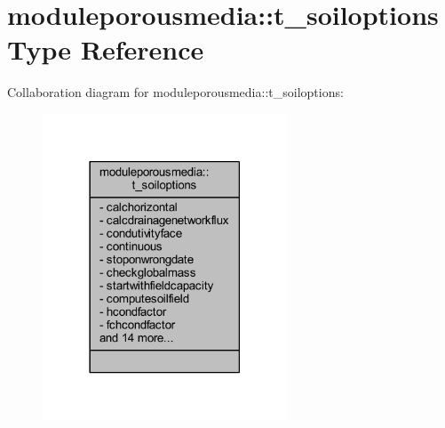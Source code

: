 \hypertarget{structmoduleporousmedia_1_1t__soiloptions}{}\section{moduleporousmedia\+:\+:t\+\_\+soiloptions Type Reference}
\label{structmoduleporousmedia_1_1t__soiloptions}


Collaboration diagram for moduleporousmedia\+:\+:t\+\_\+soiloptions\+:\nopagebreak
\begin{figure}[H]
\begin{center}
\leavevmode
\includegraphics[width=206pt]{structmoduleporousmedia_1_1t__soiloptions__coll__graph}
\end{center}
\end{figure}

